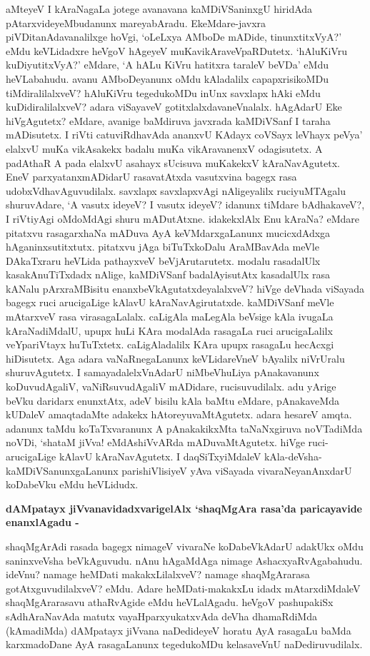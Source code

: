 \noindent
aMteyeV I kAraNagaLa jotege avanavana kaMDiVSaninxgU hiridAda pAtarxvideyeMbudanunx mareyabAradu. EkeMdare-javxra piVDitanAdavanalilxge hoVgi, `oLeLxya AMboDe mADide, tinunxtitxVyA?' eMdu keVLidadxre heVgoV hAgeyeV muKavikAraveVpaRDutetx. `hAluKiVru kuDiyutitxVyA?' eMdare, `A hALu KiVru hatitxra taraleV beVDa' eMdu heVLabahudu. avanu AMboDeyanunx oMdu kAladalilx capapxrisikoMDu tiMdiralilalxveV? hAluKiVru tegedukoMDu inUnx savxlapx hAki eMdu kuDidiralilalxveV? adara viSayaveV gotitxlalxdavaneVnalalx. hAgAdarU Eke hiVgAgutetx? eMdare, avanige baMdiruva javxrada kaMDiVSanf I taraha mADisutetx. I riVti catuviRdhavAda ananxvU KAdayx coVSayx leVhayx peVya' elalxvU muKa vikAsakekx badalu muKa vikAravanenxV odagisutetx. A padAthaR A pada elalxvU asahayx sUcisuva muKakekxV kAraNavAgutetx. EneV parxyatanxmADidarU rasavatAtxda vasutxvina bagegx rasa udobxVdhavAguvudilalx. savxlapx savxlapxvAgi nAligeyalilx ruciyuMTAgalu shuruvAdare, `A vasutx ideyeV? I vasutx ideyeV? idanunx tiMdare bAdhakaveV?, I riVtiyAgi oMdoMdAgi shuru mADutAtxne. idakekxlAlx Enu kAraNa? eMdare pitatxvu rasagarxhaNa mADuva AyA keVMdarxgaLanunx mucicxdAdxga hAganinxsutitxtutx. pitatxvu jAga biTuTxkoDalu AraMBavAda meVle DAkaTxraru heVLida pathayxveV beVjArutarutetx. modalu rasadalUlx kasakAnuTiTxdadx nAlige, kaMDiVSanf badalAyisutAtx kasadalUlx rasa kANalu pArxraMBisitu enanxbeVkAgutatxdeyalalxveV? hiVge deVhada viSayada bagegx ruci arucigaLige kAlavU kAraNavAgirutatxde. kaMDiVSanf meVle mAtarxveV rasa virasagaLalalx. caLigAla maLegAla beVsige kAla ivugaLa kAraNadiMdalU, upupx huLi KAra modalAda rasagaLa ruci arucigaLalilx veYpariVtayx huTuTxtetx. caLigAladalilx KAra upupx rasagaLu hecAcxgi hiDisutetx. Aga adara vaNaRnegaLanunx keVLidareVneV bAyalilx niVrUralu shuruvAgutetx. I samayadalelxVnAdarU niMbeVhuLiya pAnakavanunx koDuvudAgaliV, vaNiRsuvudAgaliV mADidare, rucisuvudilalx. adu yArige beVku daridarx enunxtAtx, adeV bisilu kAla baMtu eMdare, pAnakaveMda kUDaleV amaqtadaMte adakekx hAtoreyuvaMtAgutetx. adara hesareV amqta. adanunx taMdu koTaTxvaranunx A pAnakakikxMta taNaNxgiruva noVTadiMda noVDi, `shataM jiVva! eMdAshiVvARda mADuvaMtAgutetx. hiVge ruci- arucigaLige kAlavU kAraNavAgutetx. I daqSiTxyiMdaleV kAla-deVsha-kaMDiVSanunxgaLanunx parishiVlisiyeV yAva viSayada vivaraNeyanAnxdarU koDabeVku eMdu heVLidudx.

{\bigskip
\noindent
{\large\bf dAMpatayx jiVvanavidadxvarigelAlx `shaqMgAra rasa'da paricayavide enanxlAgadu -}}\label{page221}
\medskip

\noindent
shaqMgArAdi rasada bagegx nimageV vivaraNe koDabeVkAdarU adakUkx oMdu saninxveVsha beVkAguvudu. nAnu hAgaMdAga nimage AshacxyaRvAgabahudu. ideVnu? namage heMDati makakxLilalxveV? namage shaqMgArarasa gotAtxguvudilalxveV? eMdu. Adare heMDati-makakxLu idadx mAtarxdiMdaleV shaqMgArarasavu athaRvAgide eMdu heVLalAgadu. heVgoV pashupakiSx sAdhAraNavAda matutx vayaHparxyukatxvAda \hbox{deVha} dhamaRdiMda (kAmadiMda) dAMpatayx jiVvana naDedideyeV horatu AyA rasagaLu baMda karxmadoDane AyA rasagaLanunx tegedukoMDu kelasaveVnU naDediruvudilalx.

